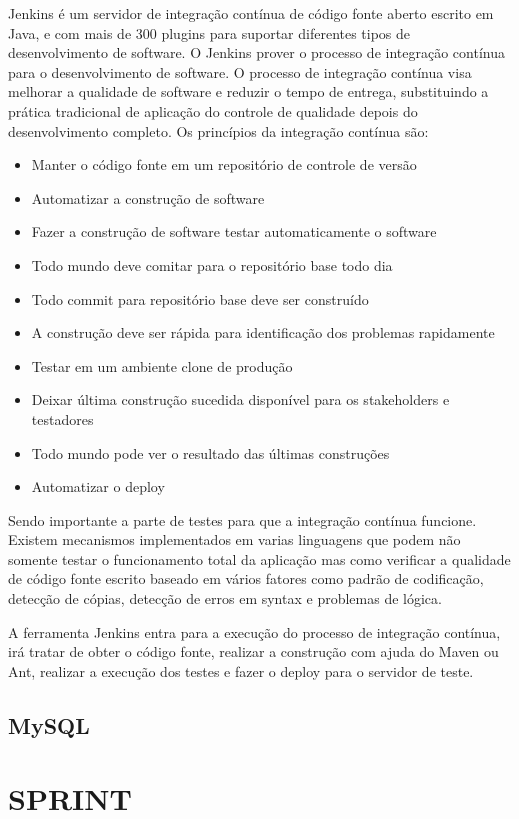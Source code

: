 \documentclass{abnt}
\begin{document}
				Jenkins é um servidor de integração contínua de código fonte aberto escrito em Java, e com mais de 300 plugins para
				suportar diferentes tipos de desenvolvimento de software. O Jenkins prover o processo de integração contínua para o
				desenvolvimento de software.
				O processo de integração contínua visa melhorar a qualidade de software e reduzir o tempo de entrega, substituindo a
				prática tradicional de aplicação do controle de qualidade depois do desenvolvimento completo. Os princípios da
				integração contínua são:
				\begin{itemize}
				  \item Manter o código fonte em um repositório de controle de versão
				  \item Automatizar a construção de software
				  \item Fazer a construção de software testar automaticamente o software
				  \item Todo mundo deve comitar para o repositório base todo dia
				  \item Todo commit para repositório base deve ser construído
				  \item A construção deve ser rápida para identificação dos problemas rapidamente
				  \item Testar em um ambiente clone de produção
				  \item Deixar última construção sucedida disponível para os stakeholders e testadores
				  \item Todo mundo pode ver o resultado das últimas construções
				  \item Automatizar o deploy
				\end{itemize}
				
				Sendo importante a parte de testes para que a integração contínua funcione. Existem mecanismos implementados em
				varias linguagens que podem não somente testar o funcionamento total da aplicação mas como verificar a qualidade de
				código fonte escrito baseado em vários fatores como padrão de codificação, detecção de cópias, detecção de erros em
				syntax e problemas de lógica.
				
				A ferramenta Jenkins entra para a execução do processo de integração contínua, irá tratar de obter o código fonte,
				realizar a construção com ajuda do Maven ou Ant, realizar a execução dos testes e fazer o deploy para o servidor de
				teste.
				
	\blindtext
	
	\section{MySQL}
	\blindtext
	

\clearpage
\chapter{SPRINT}
	
	\blindtext

	\blindtext

		

\clearpage
\nocite{*}

%		
		
\end{document}

